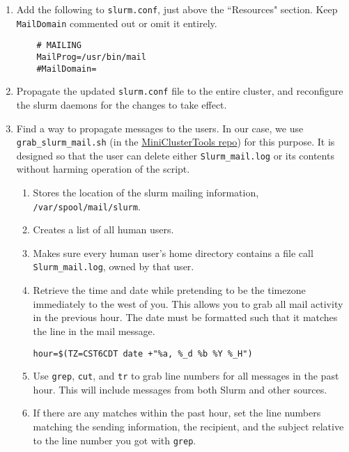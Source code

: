 \begin{enumerate}
  \item Add the following to \texttt{slurm.conf}, just above the ``Resources" section. Keep \texttt{MailDomain} commented out or omit it entirely.

	\begin{verbatim}
	# MAILING
	MailProg=/usr/bin/mail
	#MailDomain=
	\end{verbatim}

  \item Propagate the updated \texttt{slurm.conf} file to the entire cluster, and reconfigure the slurm daemons for the changes to take effect.

  \item Find a way to propagate messages to the users. In our case, we use \texttt{grab\_slurm\_mail.sh} (in the \href{https://github.com/coyleej/MiniClusterTools}{MiniClusterTools repo}) for this purpose. It is designed so that the user can delete either \texttt{Slurm\_mail.log} or its contents without harming operation of the script. 

    \begin{enumerate}
      \item Stores the location of the slurm mailing information, \texttt{/var/spool/mail/slurm}.

      \item Creates a list of all human users.

      \item Makes sure every human user's home directory contains a file call \texttt{Slurm\_mail.log}, owned by that user.

      \item Retrieve the time and date while pretending to be the timezone immediately to the west of you. This allows you to grab all mail activity in the previous hour. The date must be formatted such that it matches the line in the mail message.

        \texttt{hour=\$(TZ=CST6CDT date +"\%a, \%\_d \%b \%Y \%\_H")}

      \item Use \texttt{grep}, \texttt{cut}, and \texttt{tr} to grab line numbers for all messages in the past hour. This will include messages from both Slurm and other sources.

      \item If there are any matches within the past hour, set the line numbers matching the sending information, the recipient, and the subject relative to the line number you got with \texttt{grep}.


\end{enumerate}
\end{enumerate}
